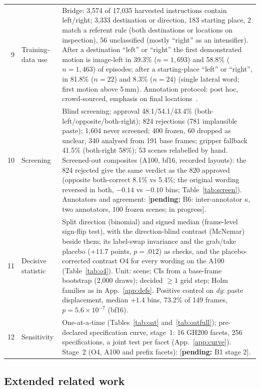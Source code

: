 \documentclass[conference]{IEEEtran}
\newcommand{\pending}[1]{\textcolor{orange!85!black}{[\textbf{pending:} #1]}}
\newcommand{\dy}{\textit{dy}}
\begin{document}
\begin{table}[t]
\begin{tabular}{@{}r L{3.0cm} L{13.6cm}@{}}
9 & Training-data use & Bridge: 3,574 of 17,035 harvested instructions contain left/right; 3,333 destination or direction, 183 starting place, 2 match a referent rule (both destinations or locations on inspection), 56 unclassified (mostly ``right'' as an intensifier). After a destination ``left'' or ``right'' the first demonstrated motion is image-left in 39.3\% ($n=1{,}693$) and 58.8\% ($n=1{,}463$) of episodes; after a starting-place ``left'' or ``right'', in 81.8\% ($n=22$) and 8.3\% ($n=24$) (single lateral word; first motion above 5\,mm). Annotation protocol: post hoc, crowd-sourced, emphasis on final locations~\cite{walke2023bridgedata}.\\
10 & Screening & Blind screening; approval 48.1/54.1/43.4\% (both-left/opposite/both-right); 824 rejections (781 implausible paste); 1,604 never screened; 400 frozen, 60 dropped as unclear, 340 analysed from 191 base frames; gripper fallback 41.5\% (both-right 58\%); 53 scenes relabelled by hand. Screened-out composites (A100, bf16, recorded layouts): the 824 rejected give the same verdict as the 820 approved (opposite both-correct 8.1\% vs 5.4\%; the original wording reversed in both, $-0.14$ vs $-0.10$ bins; Table~\ref{tab:screen}). Annotators and agreement: \pending{B6: inter-annotator $\kappa$, two annotators, 100 frozen scenes; in progress}.\\
11 & Decisive statistic & Split direction (binomial) and signed median (frame-level sign-flip test), with the direction-blind contrast (McNemar) beside them; its label-swap invariance and the grab/take placebo ($+11.7$ points, $p=.012$) as checks, and the placebo-corrected contrast O4 for every wording on the A100 (Table~\ref{tab:o4}). Unit: scene; CIs from a base-frame bootstrap (2,000 draws); decided ${\geq}1$ grid step; Holm families as in App.~\ref{app:defs}. Positive control on \dy: paste displacement, median $+1.4$ bins, 73.2\% of 149 frames, $p=5.6\times10^{-7}$ (bf16).\\
12 & Sensitivity & One-at-a-time (Tables~\ref{tab:oat} and~\ref{tab:oatfull}); pre-declared specification curve, stage~1: 16 GH200 facets, 256 specifications, a joint test per facet (App.~\ref{app:curve}). Stage~2 (O4, A100 and prefix facets): \pending{B1 stage 2}.\\
\bottomrule
\end{tabular}
\end{table}

\subsection{Extended related work}
\label{app:related}
\end{document}

